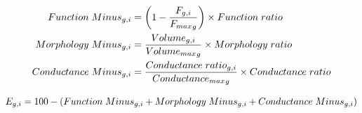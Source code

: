 {{\begin{itemize}
         \begin{align*}
           Function\hspace{1mm}Minus_{g,i} &= \left(1 - \frac{F_{g,i}}{{F_{max}}_g}\right) \times Function\hspace{1mm}ratio \\
           Morphology\hspace{1mm}Minus_{g,i} &= \frac{Volume_{g,i}}{{Volume_{max}}_g} \times Morphology\hspace{1mm}ratio \\
           Conductance\hspace{1mm}Minus_{g,i} &= \frac{Conductance\hspace{1mm}ratio_{g,i}}{{Conductance_{max}}_g} \times Conductance\hspace{1mm}ratio 
         \end{align*}
         
         \begin{equation*}
  E_{g,i} = 100 - (Function\hspace{1mm}Minus_{g,i} + Morphology\hspace{1mm}Minus_{g,i} + Conductance\hspace{1mm}Minus_{g,i})
         \end{equation*}

     \end{itemize}

}}
